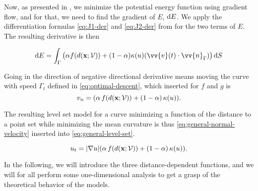 Now, as presented in , we minimize the potential energy function using gradient flow, and for that, we need to find the gradient of $E$, $\mathop{}\!\mathrm{d} E$. We apply the differentiation formulas \eqref{eq:J1-der} and \eqref{eq:J2-der} from  for the two terms of $E$. The resulting derivative is then

\begin{equation}
    \diff E = \int_{\Gamma} \big(\alpha f(d(\mathbf{x}; \pointsetm)) + (1-\alpha)\kappa(u) (\vv{v}(t) \cdot \vv{n}_{\Gamma})\big) \diff S
\end{equation}

Going in the direction of negative directional derivative means moving the curve with speed $\Gamma_t$ defined in \eqref{eq:optimal-descent}, which inserted for $f$ and $g$ is
\begin{equation}
    v_n = (\alpha \, f(d(\mathbf{x};\mathcal{V})) + (1-\alpha)\, \kappa(u)).
    \label{eq:general-normal-velocity}
\end{equation}

The resulting level set model for a curve minimizing a function of the distance to a point set while minimizing the mean curvature is thus \eqref{eq:general-normal-velocity} inserted into \eqref{eq:general-level-set}. \\
\newline
\begin{tcolorbox}[title=Generalized level set model]
\begin{equation}
    u_t = |\nabla u|(\alpha \, f(d(\mathbf{x};\mathcal{V})) + (1-\alpha)\, \kappa(u)).
    \label{eq:general-model-pde}
\end{equation} 
\end{tcolorbox}

In the following, we will introduce the three distance-dependent functions, and we will for all perform some one-dimensional analysis to get a grasp of the theoretical behavior of the models.






\clearpage








\clearpage